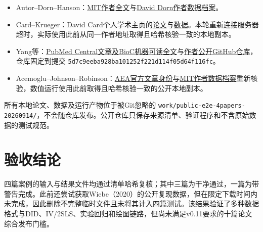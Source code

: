 \documentclass[UTF8,11pt]{ctexart}
\begin{document}
\begin{itemize}
  \item Autor--Dorn--Hanson：\href{https://economics.mit.edu/sites/default/files/publications/the\%20china\%20syndrome\%202013.pdf}{MIT作者全文}与\href{https://www.ddorn.net/data/Autor-Dorn-Hanson-ChinaSyndrome-FileArchive.zip}{David Dorn作者数据档案}。
  \item Card--Krueger：David Card个人学术主页的\href{https://davidcard.berkeley.edu/papers/min-wage-ff-nj.pdf}{论文}与\href{https://davidcard.berkeley.edu/data_sets/njmin.zip}{数据}。本轮重新连接服务器超时，实际使用此前从同一作者地址取得且哈希核验一致的本地副本。
  \item Yang等：\href{https://pmc.ncbi.nlm.nih.gov/articles/PMC10629568/}{PubMed Central文章及BioC机器可读全文}与\href{https://github.com/Science-replication-group/Unraveling_Controversies_over_Civic_Honesty_Measurement}{作者公开GitHub仓库}，仓库固定到提交 \texttt{5d7c9eeba928ba101252f221d114f05d64f116fc}。
  \item Acemoglu--Johnson--Robinson：\href{https://www.aeaweb.org/articles?id=10.1257\%2Faer.91.5.1369}{AEA官方文章身份}与\href{https://economics.mit.edu/people/faculty/daron-acemoglu/data-archive}{MIT作者数据档案}重新核验，数值运行使用此前取得且哈希核验一致的公开本地副本。
\end{itemize}

所有本地论文、数据及运行产物位于被Git忽略的 \texttt{work/public-e2e-4papers-20260914/}，不会随仓库发布。公开仓库只保存来源清单、验证程序和不含原始数据的测试规范。

\section{验收结论}

四篇案例的输入与结果文件均通过清单哈希复核；其中三篇为干净通过，一篇为带警告完成。此前还尝试获取Wiebe（2020）的公开复现数据，但在限定下载时间内未完成，因此删除不完整临时文件且未将其计入四篇测试。该结果验证了多种数据格式与DID、IV/2SLS、实验回归和绘图链路，但尚未满足v0.11要求的十篇论文综合发布门槛。
\end{document}
